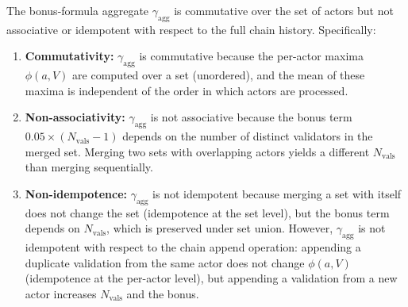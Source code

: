 \begin{theorem}\label{thm:gamma-agg-algebraic}
The bonus-formula aggregate $\gamma_{\text{agg}}$ is commutative over the set of actors but not associative or idempotent with respect to the full chain history. Specifically:
\begin{enumerate}[label=(\roman*)]
    \item \textbf{Commutativity:} $\gamma_{\text{agg}}$ is commutative because the per-actor maxima $\phi(a, V)$ are computed over a set (unordered), and the mean of these maxima is independent of the order in which actors are processed.
    \item \textbf{Non-associativity:} $\gamma_{\text{agg}}$ is not associative because the bonus term $0.05 \times (N_{\text{vals}} - 1)$ depends on the number of distinct validators in the merged set. Merging two sets with overlapping actors yields a different $N_{\text{vals}}$ than merging sequentially.
    \item \textbf{Non-idempotence:} $\gamma_{\text{agg}}$ is not idempotent because merging a set with itself does not change the set (idempotence at the set level), but the bonus term depends on $N_{\text{vals}}$, which is preserved under set union. However, $\gamma_{\text{agg}}$ is not idempotent with respect to the chain append operation: appending a duplicate validation from the same actor does not change $\phi(a, V)$ (idempotence at the per-actor level), but appending a validation from a new actor increases $N_{\text{vals}}$ and the bonus.
\end{enumerate}
\end{theorem}

